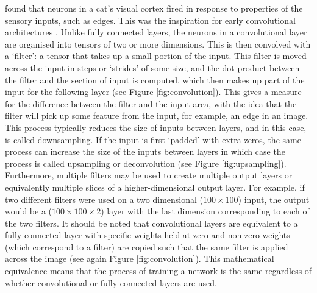 \documentclass[11pt,a4paper,onecolumn]{report}
\begin{document}
\citet{hubel_receptive_1959} found that neurons in a cat's visual cortex fired
in response to properties of the sensory inputs, such as edges. This was the
inspiration for early convolutional architectures
\citep{fukushima_neocognitron_1980}. Unlike fully connected layers, the neurons
in a convolutional layer are organised into tensors of two or more dimensions.
This is then convolved with a `filter': a tensor that takes up a small portion
of the input. This filter is moved across the input in steps or `strides' of
some size, and the dot product between the filter and the section of input is
computed, which then makes up part of the input for the following layer (see
Figure \ref{fig:convolution}). This gives a measure for the difference between
the filter and the input area, with the idea that the filter will pick up some
feature from the input, for example, an edge in an image. This process typically
reduces the size of inputs between layers, and in this case, is called
downsampling. If the input is first `padded' with extra zeros, the same process
can increase the size of the inputs between layers in which case the process is
called upsampling or deconvolution (see Figure \ref{fig:upsampling}).
Furthermore, multiple filters may be used to create multiple output layers or
equivalently multiple slices of a higher-dimensional output layer. For example,
if two different filters were used on a two dimensional ($100 \times 100$) input,
the output would be a ($100 \times 100 \times 2$) layer with the last dimension
corresponding to each of the two filters. It should be noted that convolutional
layers are equivalent to a fully connected layer with specific weights held at
zero and non-zero weights (which correspond to a filter) are copied such that
the same filter is applied across the image (see again Figure
\ref{fig:convolution}). This mathematical equivalence means that the process of
training a network is the same regardless of whether convolutional or fully
connected layers are used.
\end{document}
